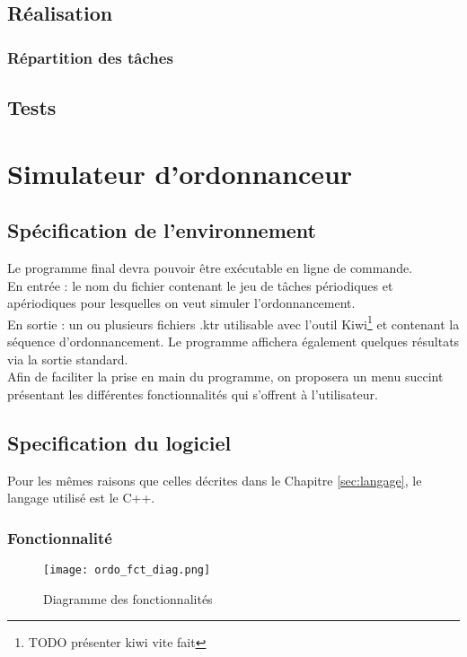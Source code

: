\section{Réalisation}
	\subsection{Répartition des tâches}

\section{Tests}



\chapter{Simulateur d'ordonnanceur}
	\section{Spécification de l’environnement}
		Le programme final devra pouvoir être exécutable en ligne de commande.\\
		
		En entrée : le nom du fichier contenant le jeu de tâches périodiques et apériodiques pour lesquelles on veut simuler l'ordonnancement.\\
		
		En sortie : un ou plusieurs fichiers .ktr utilisable avec l'outil Kiwi\footnote{\Huge TODO présenter kiwi vite fait} et contenant la séquence d'ordonnancement. Le programme affichera également quelques résultats via la sortie standard.\\
		
		Afin de faciliter la prise en main du programme, on proposera un menu succint présentant les différentes fonctionnalités qui s'offrent à l'utilisateur.
	
	\section{Specification du logiciel}
		Pour les mêmes raisons que celles décrites dans le Chapitre \ref{sec:langage}, le langage utilisé est le C++.

		\subsection{Fonctionnalité}
			\begin{figure}
				\centering
				\texttt{[image: ordo\_fct\_diag.png]}
				\caption{Diagramme des fonctionnalités}
			\end{figure}
			\FloatBarrier
			
